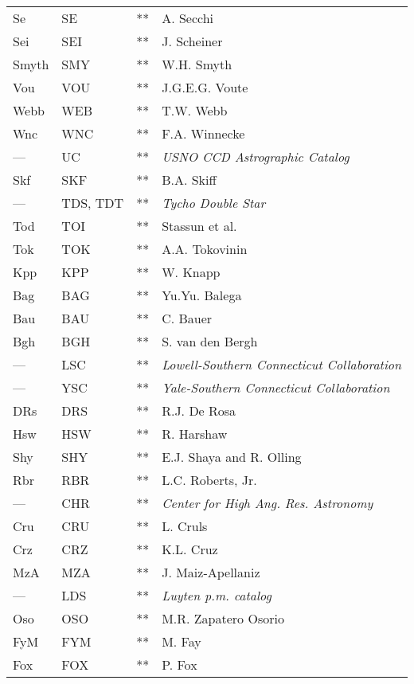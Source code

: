 \begin{longtable}{l|l|c|p{80mm}}
Se  	 	        & SE  	& ** & A. Secchi \\
Sei   		        & SEI 	& ** & J. Scheiner \\
Smyth  	 	        & SMY 	& ** & W.H. Smyth \\
Vou  	        	& VOU 	& ** & J.G.E.G. Voute \\
Webb  		        & WEB 	& ** & T.W. Webb \\
Wnc  	        	& WNC 	& ** & F.A. Winnecke \\
---		        	& UC  	& ** & \emph{USNO CCD Astrographic Catalog } \\
Skf		        	& SKF  	& ** & B.A. Skiff \\
---		        	& TDS, TDT 	& ** & \emph{Tycho Double Star} \\
Tod		        	& TOI  	& ** & Stassun et al. 		\\
Tok		        	& TOK  	& ** & A.A. Tokovinin \\
Kpp		        	& KPP  	& ** & W. Knapp \\
Bag		        	& BAG  	& ** & Yu.Yu. Balega \\
Bau		        	& BAU  	& ** & C. Bauer \\
Bgh		        	& BGH  	& ** & S. van den Bergh \\
---		        	& LSC  	& ** & \emph{Lowell-Southern Connecticut Collaboration} \\
---		        	& YSC  	& ** & \emph{Yale-Southern Connecticut  Collaboration} \\
DRs		        	& DRS  	& ** & R.J. De Rosa \\
Hsw		        	& HSW  	& ** & R. Harshaw \\
Shy		        	& SHY  	& ** & E.J. Shaya and R. Olling \\
Rbr		        	& RBR  	& ** & L.C. Roberts, Jr. \\
---		        	& CHR  	& ** & \emph{Center for High Ang. Res. Astronomy} \\
Cru		        	& CRU  	& ** & L. Cruls \\
Crz		        	& CRZ  	& ** & K.L. Cruz \\
MzA		        	& MZA  	& ** & J. Maiz-Apellaniz \\
---		        	& LDS  	& ** & \emph{Luyten p.m. catalog} \\
Oso		        	& OSO  	& ** & M.R. Zapatero Osorio \\
FyM		        	& FYM  	& ** & M. Fay \\
Fox		        	& FOX  	& ** & P. Fox \\

\end{longtable}
